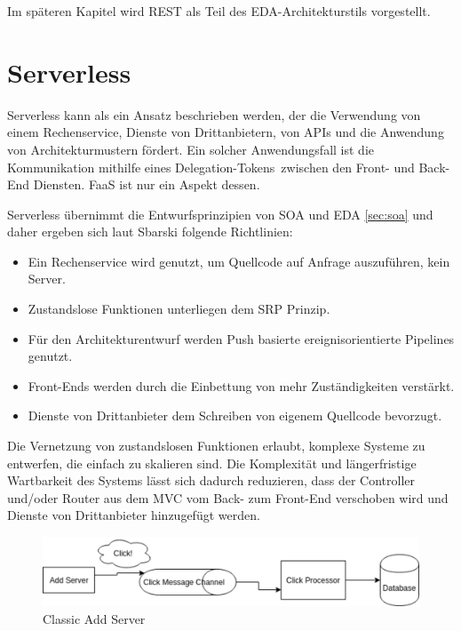 \documentclass[
12pt,
english,
ngerman,
headsepline,
twoside,
openright,
numbers=noenddot,version=first
]{scrreprt}
\begin{document}
Im späteren Kapitel wird REST als Teil des \acrshort{EDA}-Architekturstils vorgestellt.


\section{Serverless}
\label{sec:serverless}

Serverless kann als ein Ansatz beschrieben werden, der die Verwendung von einem Rechenservice, Dienste von Drittanbietern, von \acrfull{API}s und die Anwendung von Architekturmustern fördert. Ein solcher Anwendungsfall ist die Kommunikation mithilfe eines \glqq Delegation-Tokens\grqq\ zwischen den Front- und Back-End Diensten. \acrshort{FaaS} ist nur ein Aspekt dessen.


Serverless übernimmt die Entwurfsprinzipien von \acrshort{SOA} und \acrshort{EDA} \ref{sec:soa} und daher ergeben sich laut Sbarski folgende Richtlinien:
\begin{itemize}\label{par:serverless-principles}
	\item Ein Rechenservice wird genutzt, um  Quellcode auf Anfrage auszuführen, kein Server.
	\item Zustandslose Funktionen unterliegen dem \acrshort{SRP} Prinzip.
	\item Für den Architekturentwurf werden Push basierte ereignisorientierte Pipelines genutzt.
	\item Front-Ends werden durch die Einbettung von mehr Zuständigkeiten verstärkt.
	\item Dienste von Drittanbieter dem Schreiben von eigenem Quellcode bevorzugt.
\end{itemize}\cite{serverlessArchAWS}

Die Vernetzung von zustandslosen Funktionen erlaubt, komplexe Systeme zu entwerfen, die einfach zu skalieren sind.
Die Komplexität und längerfristige Wartbarkeit des Systems lässt sich dadurch reduzieren, dass der Controller und/oder Router aus dem \acrfull{MVC} \cite{fowlerBlogMVC} vom Back- zum Front-End verschoben wird und Dienste von Drittanbieter hinzugefügt werden. \cite{patternAWS}


\begin{figure}
	\includegraphics[scale=0.30]{./pics/classic-example.eps}
	\caption{Classic Add Server}
	\label{pic:classic-add}
\end{figure}
\end{document}
